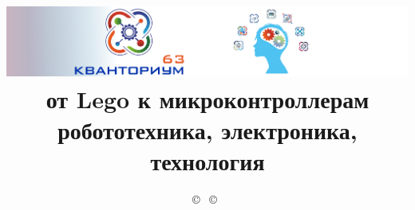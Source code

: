 

\title{\includegraphics[width=\textwidth]{img/logo63.png}\\
{\Huge от Lego к микроконтроллерам}\\
робототехника, электроника, технология}

\author{ 
\copyright\ 
\copyright\ 
}



\maketitle

\def\contentsname{\empty}
\tableofcontents\secdown



























